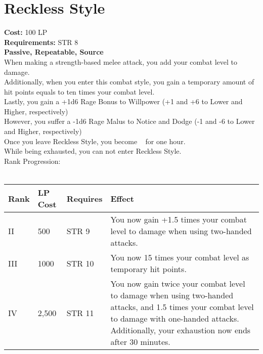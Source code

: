 \section{Reckless Style}\label{perk:recklessStyle}
\textbf{Cost:} 100 LP\\
\textbf{Requirements:} STR 8\\
\textbf{Passive, Repeatable, Source}\\
When making a strength-based melee attack, you add your combat level to damage.\\
Additionally, when you enter this combat style, you gain a temporary amount of hit points equals to ten times your combat level.\\
Lastly, you gain a +1d6 Rage Bonus to Willpower (+1 and +6 to Lower and Higher, respectively)\\
However, you suffer a -1d6 Rage Malus to Notice and Dodge (-1 and -6 to Lower and Higher, respectively)\\
Once you leave Reckless Style, you become ~ for one hour.\\
While being exhausted, you can not enter Reckless Style.\\
Rank Progression:\\
\\
\begin{longtable}{l | l | l | p{6cm}}
    Rank & LP Cost & Requires & Effect\\
    \hline
    II & 500 & STR 9 & You now gain +1.5 times your combat level to damage when using two-handed attacks.\\
    III & 1000 & STR 10 & You now 15 times your combat level as temporary hit points.\\
    IV & 2,500 & STR 11 & You now gain twice your combat level to damage when using two-handed attacks, and 1.5 times your combat level to damage with one-handed attacks.
    Additionally, your exhaustion now ends after 30 minutes.\\
\end{longtable}